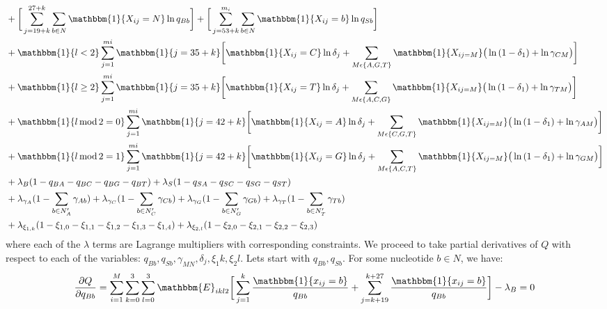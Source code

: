 \documentclass[10pt]{article}
\begin{document}
\begin{enumerate}[label = \textbf{\arabic*.}]
\begin{align}
                &+ \bigg[\sum_{j = 19 + k}^{27 + k}\sum_{b \in N}\mathbbm{1}\{X_{ij} = N\}\ln{q_{Bb}}\bigg] + \bigg[\sum_{j = 53 + k}^{m_i}\sum_{b \in N}\mathbbm{1}\{X_{ij} = b\}\ln{q_{Sb}}\bigg]\nonumber\\
                &+\mathbbm{1}\{l < 2\}\sum_{j=1}^{mi}\mathbbm{1}\{j=35+k\}\bigg[\mathbbm{1}\{X_{ij} = C\}\ln{\delta_{j}} + \sum_{M\epsilon\{A,G,T\}}\mathbbm{1}\{X_{ij=M}\}\big(\ln{(1 - \delta_{1}) + \ln{\gamma_{CM}}}\big)\bigg]\nonumber\\
                &+\mathbbm{1}\{l \geq 2\}\sum_{j=1}^{mi}\mathbbm{1}\{j=35+k\}\bigg[\mathbbm{1}\{X_{ij} = T\}\ln{\delta_{j}} + \sum_{M\epsilon\{A,C,G\}}\mathbbm{1}\{X_{ij=M }\}\big(\ln{(1 - \delta_{1}) + \ln{\gamma_{TM}}}\big)\bigg]\nonumber\\
                &+\mathbbm{1}\{l\,\mathrm{mod}\,2 = 0\}\sum_{j=1}^{mi}\mathbbm{1}\{j=42+k\}\bigg[\mathbbm{1}\{X_{ij} = A\}\ln{\delta_{j}} + \sum_{M\epsilon\{C,G,T\}}\mathbbm{1}\{X_{ij=M }\}\big(\ln{(1 - \delta_{1}) + \ln{\gamma_{AM}}}\big)\bigg]\nonumber\\
                &+\mathbbm{1}\{l\,\mathrm{mod}\,2 = 1\}\sum_{j=1}^{mi}\mathbbm{1}\{j=42+k\}\bigg[\mathbbm{1}\{X_{ij} = G\}\ln{\delta_{j}} + \sum_{M\epsilon\{A,C,T\}}\mathbbm{1}\{X_{ij=M }\}\big(\ln{(1 - \delta_{1}) + \ln{\gamma_{GM}}}\big)\bigg]\nonumber\\
                &+ \lambda_B(1 - q_{BA}- q_{BC}- q_{BG} - q_{BT}) + \lambda_S(1 - q_{SA}- q_{SC}- q_{SG} - q_{ST})\nonumber\\
                &+ \lambda_{\gamma_A}(1 - \sum_{b \in N'_A}\gamma_{Ab}) + \lambda_{\gamma_C}(1 - \sum_{b \in N'_C}\gamma_{Cb})+ \lambda_{\gamma_G}(1 - \sum_{b \in N'_G}\gamma_{Gb})+ \lambda_{\gamma_T}(1 - \sum_{b \in N'_T}\gamma_{Tb})\nonumber\\
                &+ \lambda_{\xi_{1, k}}(1 - \xi_{1, 0} - \xi_{1, 1} - \xi_{1, 2} - \xi_{1, 3} - \xi_{1, 4}) + \lambda_{\xi_{2, l}}(1 - \xi_{2, 0} - \xi_{2, 1} - \xi_{2, 2} - \xi_{2, 3})\nonumber
            \end{align}
        where each of the $\lambda$ terms are Lagrange multipliers with corresponding constraints. We proceed to take partial derivatives of $Q$ with respect to each of the variables: $q_{Bb}, q_{Sb}, \gamma_{MN}, \delta_j, \xi_1k, \xi_2l$.  Lets start with $q_{Bb}, q_{Sb}$. For some nucleotide $b \in N$, we have:
        \begin{align}
            \frac{\partial Q}{\partial q_{Bb}}&=\sum_{i=1}^M\sum_{k=0}^3\sum_{l=0}^3\mathbbm{E}_{ikl2}\bigg[\sum_{j=1}^{k}\frac{\mathbbm{1}\{x_{ij}=b\}}{q_{Bb}}+\sum_{j=k+19}^{k+27}\frac{\mathbbm{1}\{x_{ij}=b\}}{q_{Bb}}  \bigg]-\lambda_B=0\nonumber\\

\end{align}
\end{enumerate}
\end{document}
